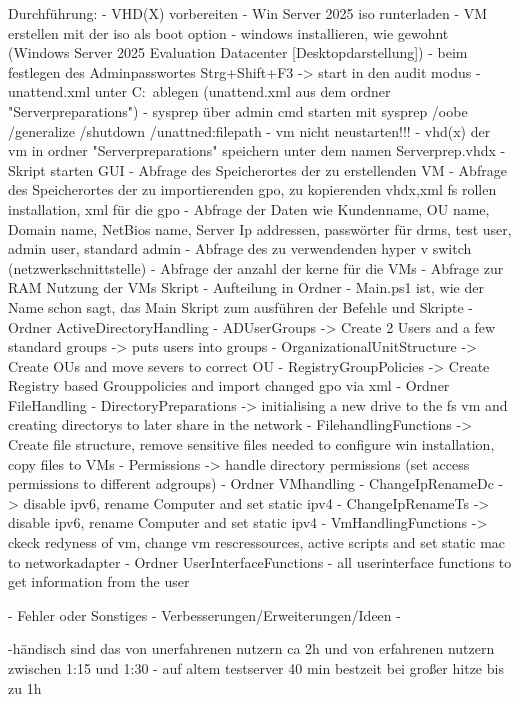 \documentclass[conference]{IEEEtran}
\begin{document}
Durchführung:
- VHD(X) vorbereiten
    - Win Server 2025 iso runterladen
    - VM erstellen mit der iso als boot option
    - windows installieren, wie gewohnt (Windows Server 2025 Evaluation Datacenter [Desktopdarstellung])
    - beim festlegen des Adminpasswortes Strg+Shift+F3 -> start in den audit modus
    - unattend.xml unter C:\ ablegen (unattend.xml aus dem ordner "Serverpreparations")
    - sysprep über admin cmd starten mit sysprep /oobe /generalize /shutdown /unattned:filepath
    - vm nicht neustarten!!!
    - vhd(x) der vm in ordner "Serverpreparations" speichern unter dem namen Serverprep.vhdx
- Skript starten
    GUI
    - Abfrage des Speicherortes der zu erstellenden VM
    - Abfrage des Speicherortes der zu importierenden gpo, zu kopierenden vhdx,xml fs rollen installation, xml für die gpo
    - Abfrage der Daten wie Kundenname, OU name, Domain name, NetBios name, Server Ip addressen, passwörter für drms, test user, admin user, standard admin
    - Abfrage des zu verwendenden hyper v switch (netzwerkschnittstelle) 
    - Abfrage der anzahl der kerne für die VMs
    - Abfrage zur RAM Nutzung der VMs
    Skript
        - Aufteilung in Ordner 
        - Main.ps1 ist, wie der Name schon sagt, das Main Skript zum ausführen der Befehle und Skripte 
    - Ordner ActiveDirectoryHandling
        - ADUserGroups -> Create 2 Users and a few standard groups -> puts users into groups
        - OrganizationalUnitStructure -> Create OUs and move severs to correct OU
        - RegistryGroupPolicies -> Create Registry based Grouppolicies and import changed gpo via xml
    - Ordner FileHandling
        - DirectoryPreparations -> initialising a new drive to the fs vm and creating directorys to later share in the network
        - FilehandlingFunctions -> Create file structure, remove sensitive files needed to configure win installation, copy files to VMs
        - Permissions -> handle directory permissions (set access permissions to different adgroups)
    - Ordner VMhandling
        - ChangeIpRenameDc -> disable ipv6, rename Computer and set static ipv4
        - ChangeIpRenameTs -> disable ipv6, rename Computer and set static ipv4
        - VmHandlingFunctions -> ckeck redyness of vm, change vm rescressources, active scripts and set static mac to networkadapter 
    - Ordner UserInterfaceFunctions
        - all userinterface functions to get information from the user
    
- Fehler oder Sonstiges
- Verbesserungen/Erweiterungen/Ideen
    - 


    -händisch sind das von unerfahrenen nutzern ca 2h und von erfahrenen nutzern zwischen 1:15 und 1:30
    - auf altem testserver 40 min bestzeit bei großer hitze bis zu 1h
\end{document}
